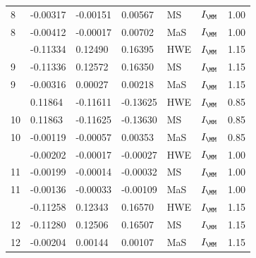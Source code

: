 \begin{table}[H]
{\begin{tabular}[t]{lllllll}
8 & -0.00317 & -0.00151 & 0.00567 & MS & $I_{\MM}$ & 1.00\\
8 & -0.00412 & -0.00017 & 0.00702 & MaS & $I_{\MM}$ & 1.00\\
\addlinespace
9 & -0.11334 & 0.12490 & 0.16395 & HWE & $I_{\MM}$ & 1.15\\
9 & -0.11336 & 0.12572 & 0.16350 & MS & $I_{\MM}$ & 1.15\\
9 & -0.00316 & 0.00027 & 0.00218 & MaS & $I_{\MM}$ & 1.15\\
\addlinespace
10 & 0.11864 & -0.11611 & -0.13625 & HWE & $I_{\MM}$ & 0.85\\
10 & 0.11863 & -0.11625 & -0.13630 & MS & $I_{\MM}$ & 0.85\\
10 & -0.00119 & -0.00057 & 0.00353 & MaS & $I_{\MM}$ & 0.85\\
\addlinespace
11 & -0.00202 & -0.00017 & -0.00027 & HWE & $I_{\MM}$ & 1.00\\
11 & -0.00199 & -0.00014 & -0.00032 & MS & $I_{\MM}$ & 1.00\\
11 & -0.00136 & -0.00033 & -0.00109 & MaS & $I_{\MM}$ & 1.00\\
\addlinespace
12 & -0.11258 & 0.12343 & 0.16570 & HWE & $I_{\MM}$ & 1.15\\
12 & -0.11280 & 0.12506 & 0.16507 & MS & $I_{\MM}$ & 1.15\\
12 & -0.00204 & 0.00144 & 0.00107 & MaS & $I_{\MM}$ & 1.15\\
\bottomrule
\end{tabular}}
\end{table}